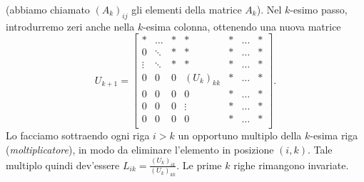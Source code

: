 \documentclass[a4paper]{report}
\theoremstyle{definiton}
\theoremstyle{remark}
\begin{document}
(abbiamo chiamato $(A_k)_{ij}$ gli elementi della matrice $A_k$).
Nel $k$-esimo passo, introdurremo zeri anche nella $k$-esima colonna, ottenendo una nuova matrice 
\[
U_{k+1} = \begin{bmatrix}
    \ast & \dots & \ast & \ast & \ast & \dots & \ast\\
    0 & \ddots & \ast& \ast & \ast& \dots & \ast\\
    \vdots & \ddots & \ast & \ast& \ast & \dots & \ast\\
    0& 0  &0 & (U_k)_{kk} & \ast & \dots & \ast\\
    0& 0  &0 & 0 & \ast & \dots & \ast\\
    0& 0  &0 & \vdots & \ast & \dots & \ast\\
    0& 0  &0 & 0 & \ast & \dots & \ast\\
\end{bmatrix}.
\]
Lo facciamo sottraendo ogni riga $i>k$ un opportuno multiplo della $k$-esima riga (\emph{moltiplicatore}), in modo da eliminare l'elemento in posizione $(i,k)$. Tale multiplo quindi dev'essere $L_{ik} = \frac{(U_k)_{ik}}{(U_k)_{kk}}$. Le prime $k$ righe rimangono invariate.
\end{document}
